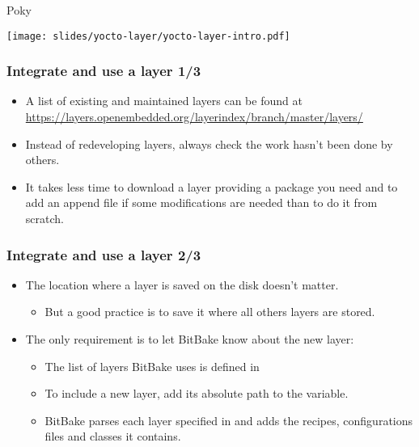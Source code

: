 \begin{frame}{Poky}
  \begin{center}
    \texttt{[image: slides/yocto-layer/yocto-layer-intro.pdf]}
  \end{center}
\end{frame}

\begin{frame}
  \frametitle{Integrate and use a layer 1/3}
  \begin{itemize}
    \item A list of existing and maintained layers can be found at
      \url{https://layers.openembedded.org/layerindex/branch/master/layers/}
    \item Instead of redeveloping layers, always check the work hasn't
      been done by others.
    \item It takes less time to download a layer providing a package
      you need and to add an append file if some modifications are
      needed than to do it from scratch.
  \end{itemize}
\end{frame}

\begin{frame}
  \frametitle{Integrate and use a layer 2/3}
  \begin{itemize}
    \item The location where a layer is saved on the disk doesn't
      matter.
    \begin{itemize}
      \item But a good practice is to save it where all others layers
        are stored.
    \end{itemize}
    \item The only requirement is to let BitBake know about the new
          layer:
    \begin{itemize}
      \item The list of layers BitBake uses is defined in
      \item To include a new layer, add its absolute path to the
         variable.
      \item BitBake parses each layer specified in  and
        adds the recipes, configurations files and classes it
        contains.
    \end{itemize}
  \end{itemize}
\end{frame}

